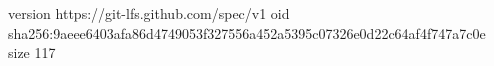 version https://git-lfs.github.com/spec/v1
oid sha256:9aeee6403afa86d4749053f327556a452a5395c07326e0d22c64af4f747a7c0e
size 117
